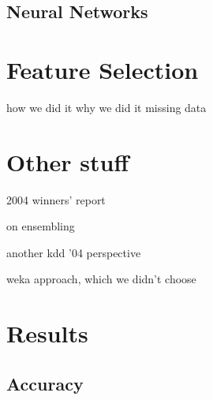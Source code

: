 \documentclass{article}
\begin{document}
\subsection{Neural Networks}



\section{Feature Selection}
how we did it
why we did it
  missing data


\section{Other stuff}
2004 winners' report \cite{vogel2004anti}

on ensembling \cite{caruana2004ensemble}

another kdd '04 perspective \cite{caruana2004kdd}

weka approach, which we didn't choose \cite{pfahringer2004weka}


\section{Results}
\subsection{Accuracy}





\end{document}
